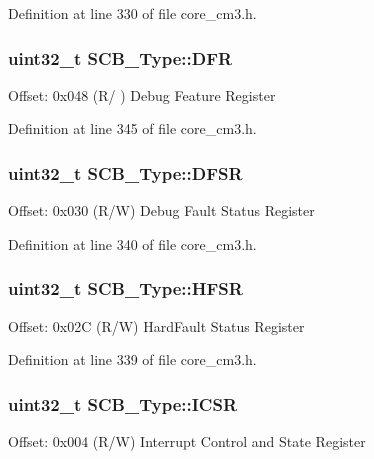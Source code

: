 Definition at line 330 of file core\+\_\+cm3.\+h.

\subsubsection[{\texorpdfstring{D\+FR}{DFR}}]{ uint32\+\_\+t S\+C\+B\+\_\+\+Type\+::\+D\+FR}\hypertarget{structSCB__Type_a586a5225467262b378c0f231ccc77f86}{}\label{structSCB__Type_a586a5225467262b378c0f231ccc77f86}
Offset\+: 0x048 (R/ ) Debug Feature Register 

Definition at line 345 of file core\+\_\+cm3.\+h.

\subsubsection[{\texorpdfstring{D\+F\+SR}{DFSR}}]{ uint32\+\_\+t S\+C\+B\+\_\+\+Type\+::\+D\+F\+SR}\hypertarget{structSCB__Type_ad7d61d9525fa9162579c3da0b87bff8d}{}\label{structSCB__Type_ad7d61d9525fa9162579c3da0b87bff8d}
Offset\+: 0x030 (R/W) Debug Fault Status Register 

Definition at line 340 of file core\+\_\+cm3.\+h.

\subsubsection[{\texorpdfstring{H\+F\+SR}{HFSR}}]{ uint32\+\_\+t S\+C\+B\+\_\+\+Type\+::\+H\+F\+SR}\hypertarget{structSCB__Type_a7bed53391da4f66d8a2a236a839d4c3d}{}\label{structSCB__Type_a7bed53391da4f66d8a2a236a839d4c3d}
Offset\+: 0x02C (R/W) Hard\+Fault Status Register 

Definition at line 339 of file core\+\_\+cm3.\+h.

\subsubsection[{\texorpdfstring{I\+C\+SR}{ICSR}}]{ uint32\+\_\+t S\+C\+B\+\_\+\+Type\+::\+I\+C\+SR}\hypertarget{structSCB__Type_a3e66570ab689d28aebefa7e84e85dc4a}{}\label{structSCB__Type_a3e66570ab689d28aebefa7e84e85dc4a}
Offset\+: 0x004 (R/W) Interrupt Control and State Register 

